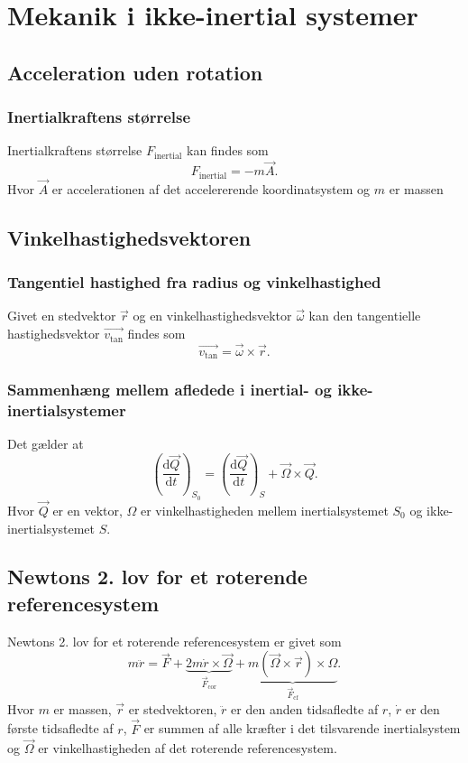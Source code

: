 \section{Mekanik i ikke-inertial systemer}

\subsection{Acceleration uden rotation}

\subsubsection{Inertialkraftens størrelse}
Inertialkraftens størrelse $F_{\text{inertial}}$ kan findes som
\[ 
F_{\text{inertial}} = -m \Vec{A}
.\]
Hvor $\Vec{A}$ er accelerationen af det accelererende koordinatsystem og $m$ er massen


\subsection{Vinkelhastighedsvektoren}

\subsubsection{Tangentiel hastighed fra radius og vinkelhastighed}
Givet en stedvektor $\Vec{r}$ og en vinkelhastighedsvektor $\Vec{\omega}$ kan den tangentielle hastighedsvektor $\Vec{v_{\text{tan}}}$ findes som
\[ 
\Vec{v_{\text{tan}}} = \Vec{\omega} \times \Vec{r}
.\]

\subsubsection{Sammenhæng mellem afledede i inertial- og ikke-inertialsystemer}
Det gælder at
\[ 
\left( \frac{\mathrm{d} \Vec{Q}}{\mathrm{d}t}  \right)_{S_0} = \left( \frac{\mathrm{d} \Vec{Q}}{\mathrm{d}t}  \right)_{S} + \Vec{\Omega} \times \Vec{Q}
.\]
Hvor $\Vec{Q}$ er en vektor, $\Omega$ er vinkelhastigheden mellem inertialsystemet $S_0$ og ikke-inertialsystemet $S$.


\subsection{Newtons 2. lov for et roterende referencesystem}
Newtons 2. lov for et roterende referencesystem er givet som
\[ 
m \ddot{r} = \Vec{F} + \underbrace{2 m \dot{r} \times \Vec{\Omega}}_{\Vec{F}_{\text{cor}}} + \underbrace{m(\Vec{\Omega} \times \Vec{r}) \times \Omega}_{\Vec{F}_{\text{cf}}}
.\]
Hvor $m$ er massen, $\Vec{r}$ er stedvektoren, $\ddot{r}$ er den anden tidsafledte af $r$, $\dot{r}$ er den første tidsafledte af $r$, $\Vec{F}$ er summen af alle kræfter i det tilsvarende inertialsystem og $\Vec{\Omega}$ er vinkelhastigheden af det roterende referencesystem.


